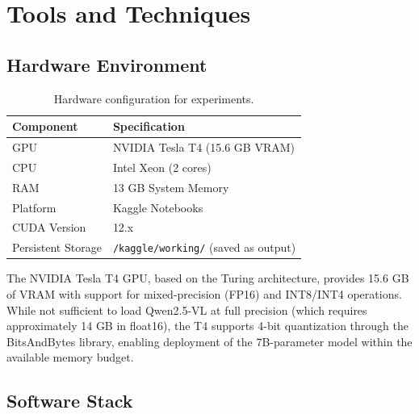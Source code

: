 \section{Tools and Techniques}

\subsection{Hardware Environment}

\begin{table}[H]
\centering
\caption{Hardware configuration for experiments.}
\label{tab:hardware_config}
\begin{tabular}{ll}
\toprule
\textbf{Component} & \textbf{Specification} \\
\midrule
GPU & NVIDIA Tesla T4 (15.6 GB VRAM) \\
CPU & Intel Xeon (2 cores) \\
RAM & 13 GB System Memory \\
Platform & Kaggle Notebooks \\
CUDA Version & 12.x \\
Persistent Storage & \texttt{/kaggle/working/} (saved as output) \\
\bottomrule
\end{tabular}
\end{table}

The NVIDIA Tesla T4 GPU, based on the Turing architecture, provides 15.6 GB of VRAM with support for mixed-precision (FP16) and INT8/INT4 operations. While not sufficient to load Qwen2.5-VL at full precision (which requires approximately 14 GB in float16), the T4 supports 4-bit quantization through the BitsAndBytes library, enabling deployment of the 7B-parameter model within the available memory budget.

\subsection{Software Stack}

